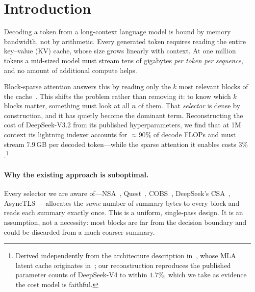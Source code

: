 \documentclass[sigconf,nonacm,11pt]{acmart}
\begin{document}

\maketitle

\section{Introduction}

Decoding a token from a long-context language model is bound by memory
bandwidth, not by arithmetic. Every generated token requires reading the entire
key--value (KV) cache, whose size grows linearly with context. At one million
tokens a mid-sized model must stream tens of gigabytes \emph{per token per
sequence}, and no amount of additional compute helps.

Block-sparse attention answers this by reading only the $k$ most relevant blocks
of the cache~\cite{yuan2025nsa,tang2024quest}. This shifts the problem rather
than removing it: to know which $k$ blocks matter, something must look at all
$n$ of them. That \emph{selector} is dense by construction, and it has quietly
become the dominant term. Reconstructing the cost of DeepSeek-V3.2 from its
published hyperparameters, we find that at 1M context its lightning indexer
accounts for $\approx$90\% of decode FLOPs and must stream $7.9$\,GB per decoded
token---while the sparse attention it enables costs $3\%$.\footnote{Derived
independently from the architecture description
in~\cite{deepseek2025v32,deepseek2024v3}, whose MLA latent cache originates
in~\cite{deepseek2024v2}; our reconstruction reproduces the
published parameter counts of DeepSeek-V4 to within $1.7\%$, which we take as
evidence the cost model is faithful.}

\paragraph{Why the existing approach is suboptimal.} Every selector we are aware
of---NSA~\cite{yuan2025nsa}, Quest~\cite{tang2024quest},
COBS~\cite{tian2026cobs}, DeepSeek's CSA~\cite{deepseek2026v4},
AsyncTLS~\cite{hu2026asynctls}---allocates the \emph{same} number of summary
bytes to every block and reads each summary exactly once. This is a uniform,
single-pass design. It is an assumption, not a necessity: most blocks are far
from the decision boundary and could be discarded from a much coarser summary.
\end{document}

